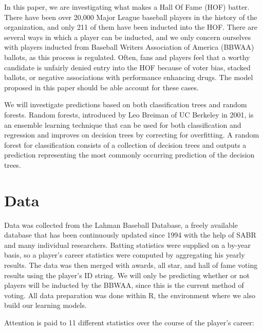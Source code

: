 \documentclass[preprint,12pt]{elsarticle}
\begin{document}
In this paper, we are investigating what makes a Hall Of Fame (HOF) batter. There have been over 20,000 Major League baseball players in the history of the organization, and only 211 of them have been inducted into the HOF. There are several ways in which a player can be inducted, and we only concern ourselves with players inducted from Baseball Writers Association of America (BBWAA) ballots, as this process is regulated. Often, fans and players feel that a worthy candidate is unfairly denied entry into the HOF because of voter bias, stacked ballots, or negative associations with performance enhancing drugs. The model proposed in this paper should be able account for these cases.

We will investigate predictions based on both classification trees and random forests. Random forests, introduced by Leo Breiman of UC Berkeley in 2001, is an ensemble learning technique that can be used for both classification and regression and improves on decision trees by correcting for overfitting. A random forest for classification consists of a collection of decision trees and outputs a prediction representing the most commonly occurring prediction of the decision trees.

\section{Data}
\label{data}
Data was collected from the Lahman Baseball Database, a freely available database that has been continuously updated since 1994 with the help of SABR and many individual researchers. Batting statistics were supplied on a by-year basis, so a player's career statistics were computed by aggregating his yearly results. The data was then merged with awards, all star, and hall of fame voting results using the player's ID string. We will only be predicting whether or not players will be inducted by the BBWAA, since this is the current method of voting. All data preparation was done within R, the environment where we also build our learning models. 

Attention is paid to 11 different statistics over the course of the player's career:
\end{document}
